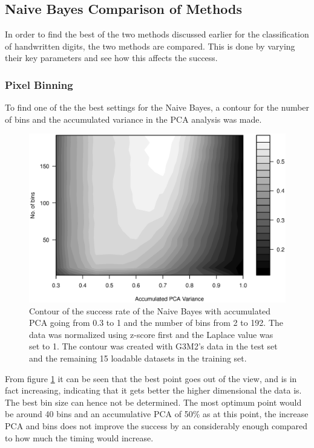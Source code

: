 \subsection{Naive Bayes Comparison of Methods}
In order to find the best of the two methods discussed earlier for the classification of handwritten digits, the two methods are compared.
This is done by varying their key parameters and see how this affects the success.

\subsubsection{Pixel Binning}
To find one of the the best settings for the Naive Bayes, a contour for the number of bins and the accumulated variance in the PCA analysis was made.

\begin{figure}[H]
\centering
\includegraphics[width = \textwidth]{graphics/contour_bins_vs_pca}
\caption{Contour of the success rate of the Naive Bayes with accumulated PCA going from 0.3 to 1 and the number of bins from 2 to 192.
The data was normalized using z-score first and the Laplace value was set to 1.
The contour was created with G3M2's data in the test set and the remaining 15 loadable datasets in the training set.}
\label{fig:contour_bin-vs-pca}
\end{figure}

From figure \ref{fig:contour_bin-vs-pca} it can be seen that the best point goes out of the view, and is in fact increasing, indicating that it gets better the higher dimensional the data is. The best bin size can hence not be determined. The most optimum point would be around 40 bins and an accumulative PCA of 50\% as at this point, the increase PCA and bins does not improve the success by an considerably enough compared to how much the timing would increase.

